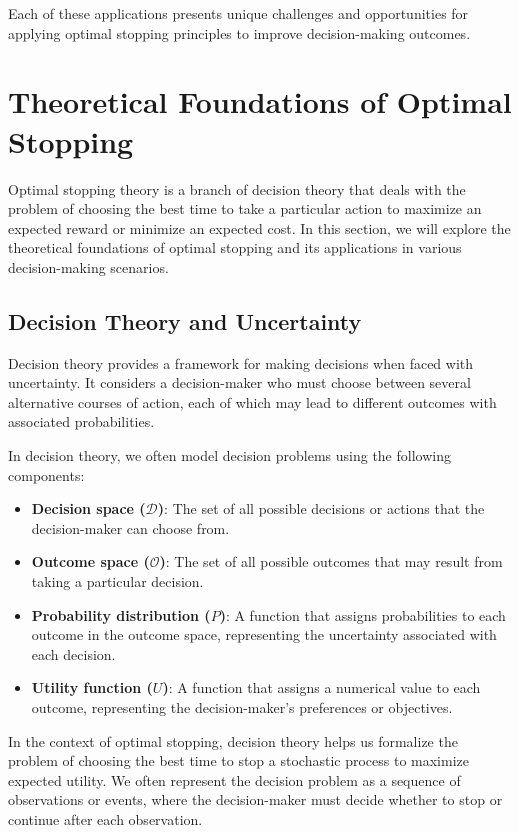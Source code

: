 \documentclass[12pt]{book} %
\begin{document}
Each of these applications presents unique challenges and opportunities for applying optimal stopping principles to improve decision-making outcomes.

\section{Theoretical Foundations of Optimal Stopping}

Optimal stopping theory is a branch of decision theory that deals with the problem of choosing the best time to take a particular action to maximize an expected reward or minimize an expected cost. In this section, we will explore the theoretical foundations of optimal stopping and its applications in various decision-making scenarios.

\subsection{Decision Theory and Uncertainty}

Decision theory provides a framework for making decisions when faced with uncertainty. It considers a decision-maker who must choose between several alternative courses of action, each of which may lead to different outcomes with associated probabilities.

In decision theory, we often model decision problems using the following components:

\begin{itemize}
    \item \textbf{Decision space ($\mathcal{D}$)}: The set of all possible decisions or actions that the decision-maker can choose from.
    \item \textbf{Outcome space ($\mathcal{O}$)}: The set of all possible outcomes that may result from taking a particular decision.
    \item \textbf{Probability distribution ($P$)}: A function that assigns probabilities to each outcome in the outcome space, representing the uncertainty associated with each decision.
    \item \textbf{Utility function ($U$)}: A function that assigns a numerical value to each outcome, representing the decision-maker's preferences or objectives.
\end{itemize}

In the context of optimal stopping, decision theory helps us formalize the problem of choosing the best time to stop a stochastic process to maximize expected utility. We often represent the decision problem as a sequence of observations or events, where the decision-maker must decide whether to stop or continue after each observation.
\end{document}
